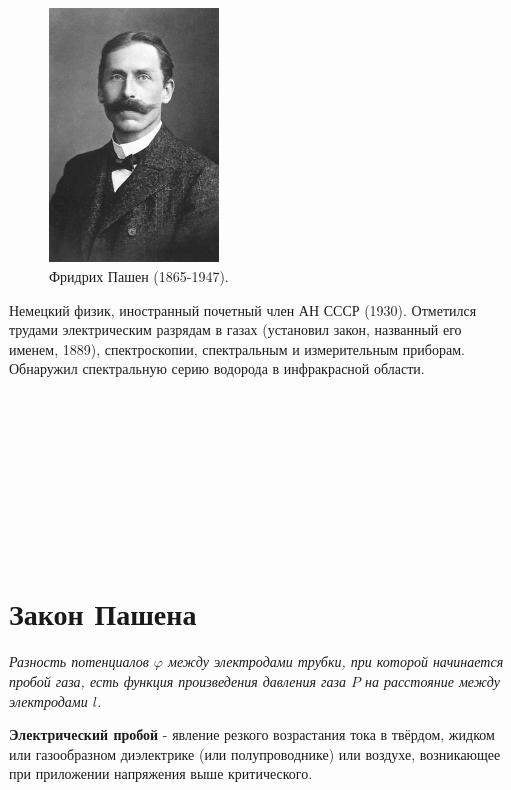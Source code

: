 \documentclass[a4paper, 12pt]{article}
\begin{document}
\begin{figure}
	\vspace{-10pt}
	\centering
	\includegraphics[width=0.4\textwidth]{ pics/pashen.jpg}
	\caption{Фридрих Пашен (1865-1947).}
	\label{img:plasma probe}
\end{figure}

Немецкий физик, иностранный почетный член АН СССР (1930). Отметился трудами электрическим разрядам в
газах (установил закон, названный его именем, 1889), спектроскопии, спектральным и
измерительным приборам. Обнаружил спектральную серию водорода в инфракрасной области.
\\ \\ \\ \\ \\ \\ \\ \\ \\ \\



\section{Закон Пашена}

\textit{Разность потенциалов $\varphi$ между электродами трубки, при которой начинается пробой газа, есть
функция произведения давления газа $P$ на расстояние между электродами $l$.}
\par
\textbf{Электрический пробой} - явление резкого возрастания тока в твёрдом, жидком или
газообразном диэлектрике (или полупроводнике) или воздухе, возникающее при приложении напряжения
выше критического.
\end{document}
